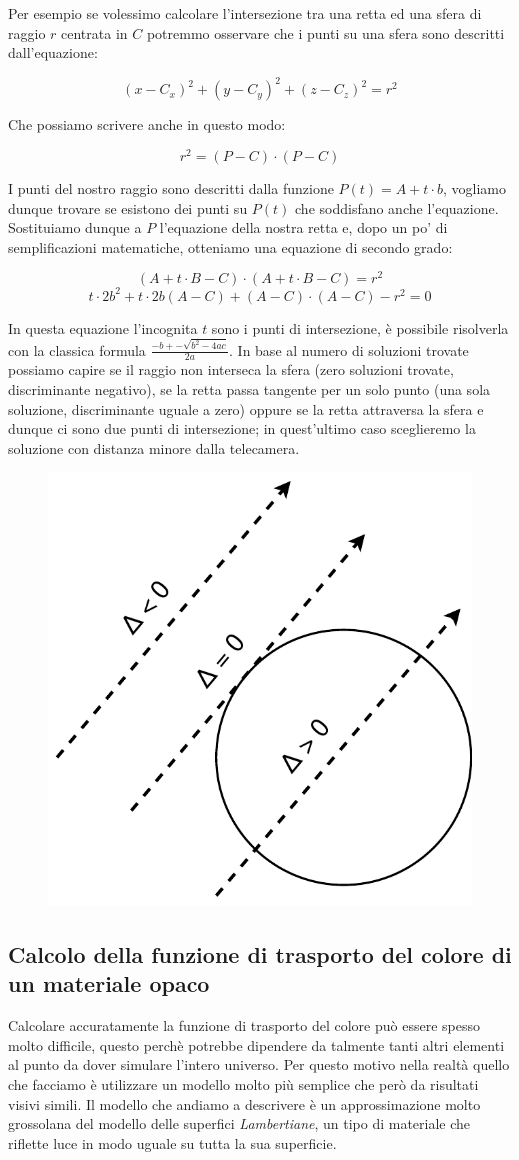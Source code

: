 \documentclass[12pt, twoside]{article}
\begin{document}
Per esempio se volessimo calcolare l'intersezione tra una retta ed una sfera
di raggio $r$ centrata in $C$ potremmo osservare che i punti su una sfera sono
descritti dall'equazione:

$$
    (x - C_x)^2 + (y - C_y)^2 + (z - C_z)^2 = r^2
$$

Che possiamo scrivere anche in questo modo:

$$
    r^2 = (P - C) \cdot (P - C)
$$

I punti del nostro raggio sono descritti dalla funzione $P(t)=A + t \cdot b$,
vogliamo dunque trovare se esistono dei punti su $P(t)$ che soddisfano anche
l'equazione.
Sostituiamo dunque a $P$ l'equazione della nostra retta e, dopo un po' di
semplificazioni matematiche, otteniamo una equazione di secondo grado:

$$
  (A + t \cdot B - C) \cdot (A + t \cdot B - C) = r^2
$$
$$
  t \cdot 2b^2 + t \cdot 2b (A-C) + (A-C) \cdot (A-C) - r^2 = 0
$$

In questa equazione l'incognita $t$ sono i punti di intersezione, è possibile
risolverla con la classica formula $\frac{-b +- \sqrt{b^2 - 4ac}}{2a}$.
In base al numero di soluzioni trovate possiamo capire se il raggio non
interseca la sfera (zero soluzioni trovate, discriminante negativo), se la
retta passa tangente per un solo punto (una sola soluzione, discriminante
uguale a zero) oppure se la retta attraversa la sfera e dunque ci sono due
punti di intersezione; in quest'ultimo caso sceglieremo la soluzione con
distanza minore dalla telecamera.

\begin{figure}[h]
  \centering
  \includegraphics[width=0.3\linewidth,keepaspectratio]{images/SphereRayIntersection.pdf}
\end{figure}

\subsection{Calcolo della funzione di trasporto del colore di un materiale opaco}

Calcolare accuratamente la funzione di trasporto del colore può essere spesso
molto difficile, questo perchè potrebbe dipendere da talmente tanti altri
elementi al punto da dover simulare l'intero universo.
Per questo motivo nella realtà quello che facciamo è utilizzare un modello
molto più semplice che però da risultati visivi simili.
Il modello che andiamo a descrivere è un approssimazione molto grossolana del
modello delle superfici \textit{Lambertiane}, un tipo di materiale che riflette
luce in modo uguale su tutta la sua superficie.
\end{document}
